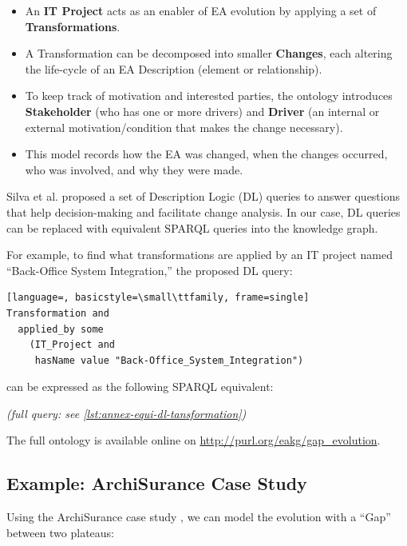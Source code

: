 \begin{itemize}
    \item An \textbf{IT Project} acts as an enabler of EA evolution by applying a set of \textbf{Transformations}.
    \item A Transformation can be decomposed into smaller \textbf{Changes}, each altering the life-cycle of an EA Description (element or relationship).
    \item To keep track of motivation and interested parties, the ontology introduces \textbf{Stakeholder} (who has one or more drivers) and \textbf{Driver} (an internal or external motivation/condition that makes the change necessary).
    \item This model records how the EA was changed, when the changes occurred, who was involved, and why they were made.
\end{itemize}

Silva et al. \parencite{silva2017evolution} proposed a set of Description Logic (DL) queries to answer questions that help decision-making and facilitate change analysis. In our case, DL queries can be replaced with equivalent SPARQL queries into the knowledge graph.

\begin{samepage}
For example, to find what transformations are applied by an IT project named ``Back-Office System Integration,'' the proposed DL query:

\begin{lstlisting}[language=, basicstyle=\small\ttfamily, frame=single]
Transformation and
  applied_by some
    (IT_Project and
     hasName value "Back-Office_System_Integration")
\end{lstlisting}
\end{samepage}

can be expressed as the following SPARQL equivalent:

\textit{(full query: see \autoref{lst:annex-equi-dl-tansformation})}

The full ontology is available online on \url{http://purl.org/eakg/gap_evolution}.
\subsection{Example: ArchiSurance Case Study}
\label{subsec:gap-example}

Using the ArchiSurance case study \parencite{jonkers2016archisurance}, we can model the evolution with a ``Gap'' between two plateaus:

